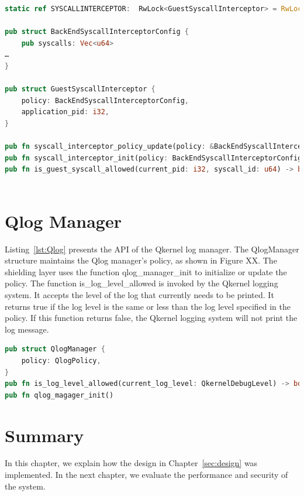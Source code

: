 \begin{lstlisting}[language=rust, caption= API of system call interceptor, label={lst:Interceptor}]
static ref SYSCALLINTERCEPTOR:  RwLock<GuestSyscallInterceptor> = RwLock::new(GuestSyscallInterceptor::default());

pub struct BackEndSyscallInterceptorConfig {
    pub syscalls: Vec<u64>
…
}

pub struct GuestSyscallInterceptor {
    policy: BackEndSyscallInterceptorConfig,
    application_pid: i32,
}

pub fn syscall_interceptor_policy_update(policy: &BackEndSyscallInterceptorConfig) -> Result<()> 
pub fn syscall_interceptor_init(policy: BackEndSyscallInterceptorConfig) -> Result<()> 
pub fn is_guest_syscall_allowed(current_pid: i32, syscall_id: u64) -> bool
    
\end{lstlisting}


\section{Qlog Manager}

Listing~\ref{lst:Qlog} presents the API of the Qkernel log manager. The QlogManager structure maintains the Qlog manager's policy, as shown in Figure XX. The shielding layer uses the function  qlog\_manager\_init to initialize or update the policy. The function is\_log\_level\_allowed  is invoked by 
the Qkernel logging system. It accepts the level of the log that currently needs to be printed. It returns true if the log level is the same or less than the log level specified in the policy. If this function returns false, the Qkernel logging system will not print the log message.

\begin{lstlisting}[language=rust, caption= API of Qlog manager, label={lst:Qlog}]
pub struct QlogManager {
    policy: QlogPolicy,
}
pub fn is_log_level_allowed(current_log_level: QkernelDebugLevel) -> bool
pub fn qlog_magager_init()   
\end{lstlisting}


\section{Summary}
In this chapter, we explain how the design in Chapter~\ref{sec:design} was implemented. In the next chapter, we evaluate the performance and security of the system.


\cleardoublepage




